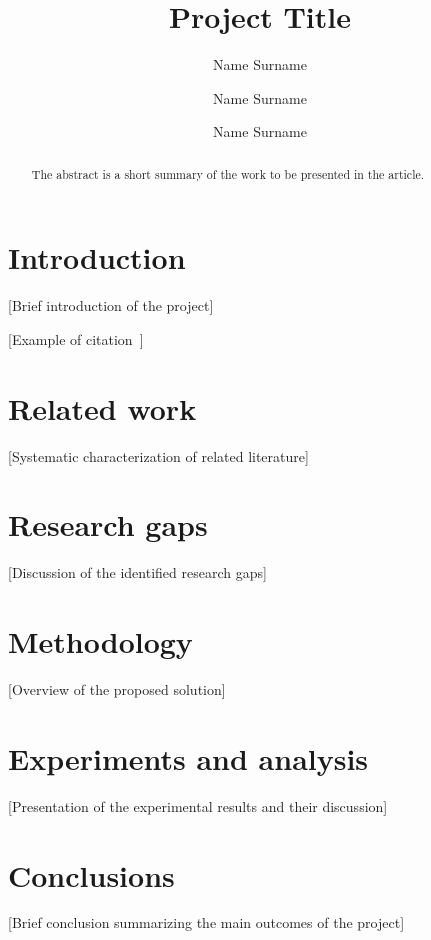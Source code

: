 \documentclass[sigconf, nonacm]{acmart}
\begin{document}
\title{Project Title}

\author{Name Surname}

\author{Name Surname}
\author{Name Surname}



\begin{abstract}
The abstract is a short summary of the work to be presented in the article.
\end{abstract}



\keywords{}



\maketitle

\section{Introduction}
[Brief introduction of the project]

[Example of citation~\cite{VanGundy07}]

\section{Related work}
[Systematic characterization of related literature]

\section{Research gaps}
[Discussion of the identified research gaps]

\section{Methodology}
[Overview of the proposed solution]


\section{Experiments and analysis}
[Presentation of the experimental results and their discussion]



\section{Conclusions}
[Brief conclusion summarizing the main outcomes of the project]




\end{document}

